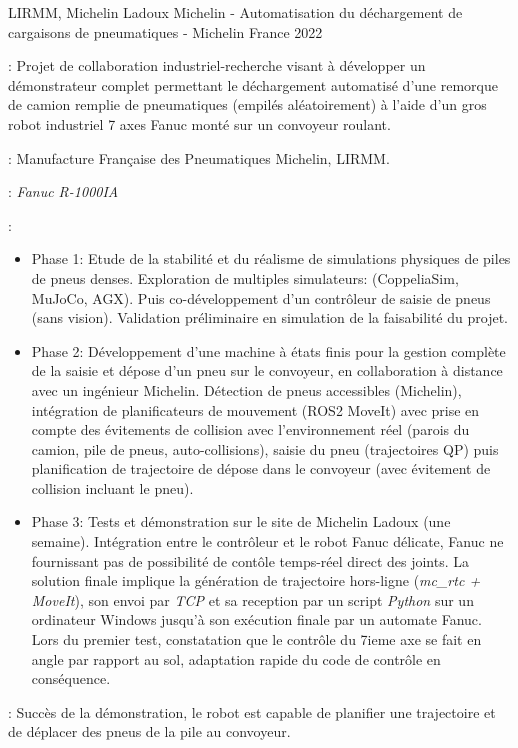 \begin{cventries}
  \cventry
    {LIRMM, Michelin Ladoux} %
    {Michelin - Automatisation du déchargement de cargaisons de pneumatiques ‑ Michelin} %
    {France} %
    {2022} %
    {
      \begin{cvitems} 
        \item {} : Projet de collaboration industriel-recherche visant à développer un démonstrateur complet permettant le déchargement automatisé d'une remorque de camion remplie de pneumatiques (empilés aléatoirement) à l'aide d'un gros robot industriel 7 axes Fanuc monté sur un convoyeur roulant.
        \item {} : Manufacture Française des Pneumatiques Michelin, LIRMM.
        \item {} : \emph{Fanuc R-1000IA}
        \item {} :
          \begin{itemize}
            \item Phase 1: Etude de la stabilité et du réalisme de simulations physiques de piles de pneus denses. Exploration de multiples simulateurs: (CoppeliaSim, MuJoCo, AGX). Puis co-développement d'un contrôleur de saisie de pneus (sans vision). Validation préliminaire en simulation de la faisabilité du projet.
            \item Phase 2: Développement d'une machine à états finis pour la gestion complète de la saisie et dépose d'un pneu sur le convoyeur, en collaboration à distance avec un ingénieur Michelin. Détection de pneus accessibles (Michelin), intégration de planificateurs de mouvement (ROS2 MoveIt) avec prise en compte des évitements de collision avec l'environnement réel (parois du camion, pile de pneus, auto-collisions), saisie du pneu (trajectoires QP) puis planification de trajectoire de dépose dans le convoyeur (avec évitement de collision incluant le pneu).
            \item Phase 3: Tests et démonstration sur le site de Michelin Ladoux (une semaine). Intégration entre le contrôleur et le robot Fanuc délicate, Fanuc ne fournissant pas de possibilité de contôle temps-réel direct des joints. La solution finale implique la génération de trajectoire hors-ligne (\emph{mc\_rtc + MoveIt}), son envoi par \emph{TCP} et sa reception par un script \emph{Python} sur un ordinateur Windows jusqu'à son exécution finale par un automate Fanuc. Lors du premier test, constatation que le contrôle du 7ieme axe se fait en angle par rapport au sol, adaptation rapide du code de contrôle en conséquence.
          \end{itemize}
        \item {} : Succès de la démonstration, le robot est capable de planifier une trajectoire et de déplacer des pneus de la pile au convoyeur.
      \end{cvitems}
    }
    

\end{cventries}
